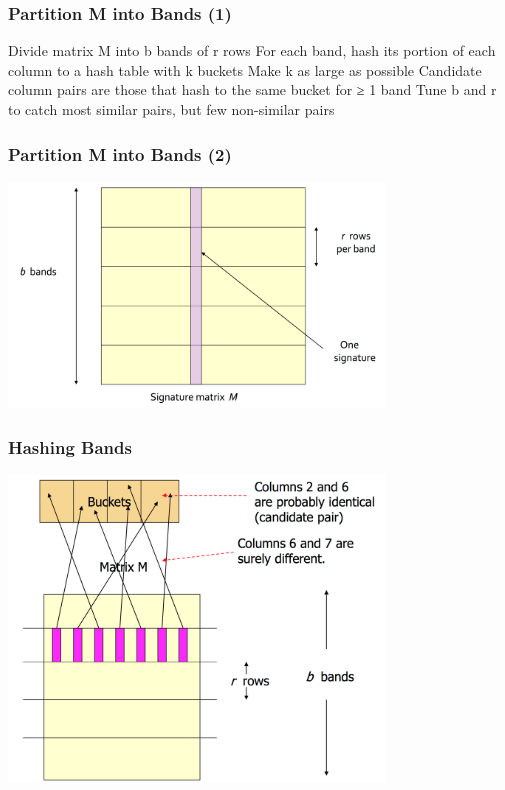 \documentclass[svgnames]{beamer}
\begin{document}
  
\begin{frame} \frametitle{Partition M into Bands (1)}

Divide matrix M into b bands of r rows
For each band, hash its portion of each column to a hash table with k buckets
Make k as large as possible
Candidate column pairs are those that hash to the same bucket for ≥ 1 band
Tune b and r to catch most similar pairs, but few non-similar pairs

\end{frame}

  
\begin{frame} \frametitle{Partition M into Bands (2)}

\includegraphics[width=10cm]{bands}

\end{frame}

  
\begin{frame} \frametitle{Hashing Bands}

\includegraphics[width=10cm]{hashing-bands}

\end{frame}
\end{document}

